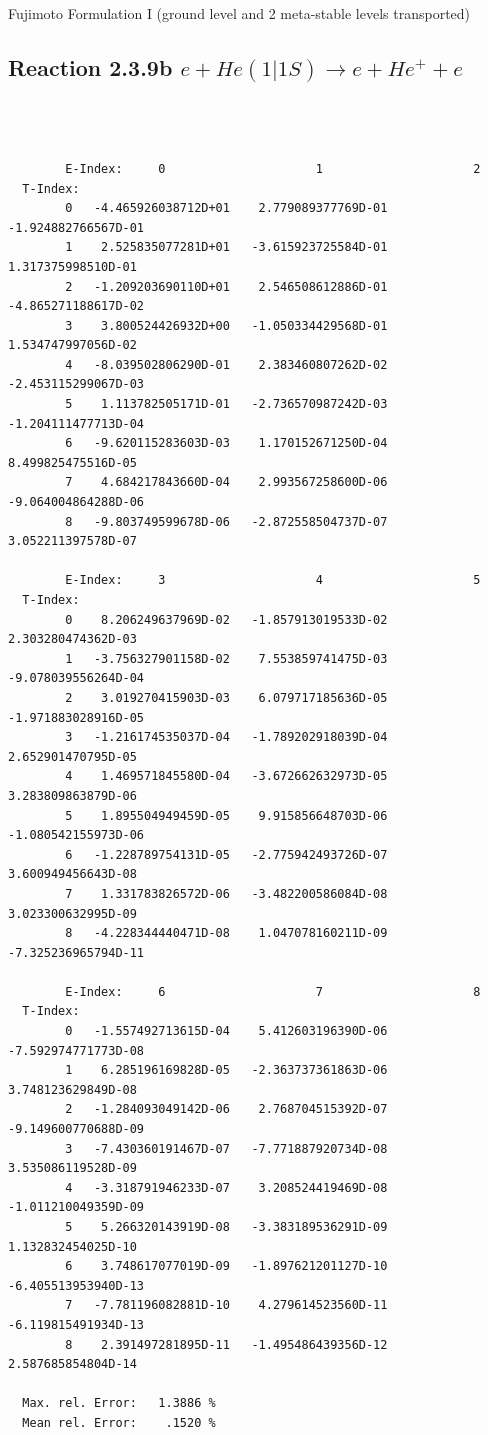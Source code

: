 \documentclass[12pt,dvips]{article}
\begin{document}
 Fujimoto Formulation I (ground level and 2 meta-stable levels transported)

\subsection{
Reaction 2.3.9b  $e + He(1|1S) \rightarrow e + He^+ + e  $
}


\begin{small}\begin{verbatim}



        E-Index:     0                     1                     2
  T-Index:
        0   -4.465926038712D+01    2.779089377769D-01   -1.924882766567D-01
        1    2.525835077281D+01   -3.615923725584D-01    1.317375998510D-01
        2   -1.209203690110D+01    2.546508612886D-01   -4.865271188617D-02
        3    3.800524426932D+00   -1.050334429568D-01    1.534747997056D-02
        4   -8.039502806290D-01    2.383460807262D-02   -2.453115299067D-03
        5    1.113782505171D-01   -2.736570987242D-03   -1.204111477713D-04
        6   -9.620115283603D-03    1.170152671250D-04    8.499825475516D-05
        7    4.684217843660D-04    2.993567258600D-06   -9.064004864288D-06
        8   -9.803749599678D-06   -2.872558504737D-07    3.052211397578D-07

        E-Index:     3                     4                     5
  T-Index:
        0    8.206249637969D-02   -1.857913019533D-02    2.303280474362D-03
        1   -3.756327901158D-02    7.553859741475D-03   -9.078039556264D-04
        2    3.019270415903D-03    6.079717185636D-05   -1.971883028916D-05
        3   -1.216174535037D-04   -1.789202918039D-04    2.652901470795D-05
        4    1.469571845580D-04   -3.672662632973D-05    3.283809863879D-06
        5    1.895504949459D-05    9.915856648703D-06   -1.080542155973D-06
        6   -1.228789754131D-05   -2.775942493726D-07    3.600949456643D-08
        7    1.331783826572D-06   -3.482200586084D-08    3.023300632995D-09
        8   -4.228344440471D-08    1.047078160211D-09   -7.325236965794D-11

        E-Index:     6                     7                     8
  T-Index:
        0   -1.557492713615D-04    5.412603196390D-06   -7.592974771773D-08
        1    6.285196169828D-05   -2.363737361863D-06    3.748123629849D-08
        2   -1.284093049142D-06    2.768704515392D-07   -9.149600770688D-09
        3   -7.430360191467D-07   -7.771887920734D-08    3.535086119528D-09
        4   -3.318791946233D-07    3.208524419469D-08   -1.011210049359D-09
        5    5.266320143919D-08   -3.383189536291D-09    1.132832454025D-10
        6    3.748617077019D-09   -1.897621201127D-10   -6.405513953940D-13
        7   -7.781196082881D-10    4.279614523560D-11   -6.119815491934D-13
        8    2.391497281895D-11   -1.495486439356D-12    2.587685854804D-14

  Max. rel. Error:   1.3886 %
  Mean rel. Error:    .1520 %

\end{verbatim}\end{small}
\end{document}
